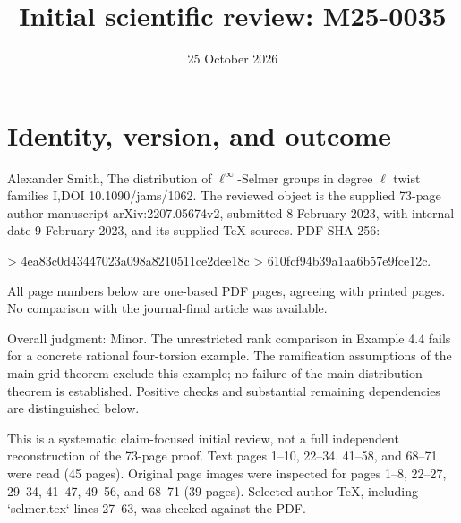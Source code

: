 \documentclass[10pt]{article}
\title{Initial scientific review: M25-0035}
\author{}
\date{25 October 2026}
\begin{document}
\maketitle
\section*{Identity, version, and outcome}
Alexander Smith, The distribution of \(\ell^\infty\)-Selmer groups in degree \(\ell\) twist families I,DOI 10.1090/jams/1062. The reviewed object is the supplied 73-page author manuscript arXiv:2207.05674v2, submitted 8 February 2023, with internal date 9 February 2023, and its supplied TeX sources. PDF SHA-256:\par
> 4ea83c0d43447023a098a8210511ce2dee18c
> 610fcf94b39a1aa6b57e9fce12c.\par
All page numbers below are one-based PDF pages, agreeing with printed pages. No comparison with the journal-final article was available.\par
Overall judgment: Minor. The unrestricted rank comparison in Example 4.4 fails for a concrete rational four-torsion example. The ramification assumptions of the main grid theorem exclude this example; no failure of the main distribution theorem is established. Positive checks and substantial remaining dependencies are distinguished below.\par
This is a systematic claim-focused initial review, not a full independent reconstruction of the 73-page proof. Text pages 1–10, 22–34, 41–58, and 68–71 were read (45 pages). Original page images were inspected for pages 1–8, 22–27, 29–34, 41–47, 49–56, and 68–71 (39 pages). Selected author TeX, including `selmer.tex` lines 27–63, was checked against the PDF.\par
\end{document}
